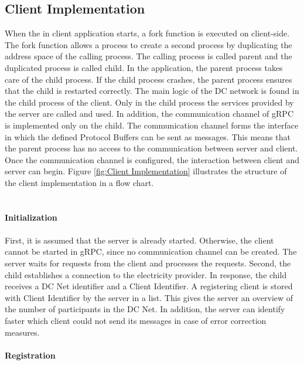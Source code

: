 \subsection{Client Implementation}
When the in client application starts, a fork function is executed on client-side. The fork function allows a process to create a second process by duplicating the address space of the calling process. The calling process is called parent and the duplicated process is called child. In the application, the parent process takes care of the child process. If the child process crashes, the parent process ensures that the child is restarted correctly. The main logic of the DC network is found in the child process of the client. Only in the child process the services provided by the server are called and used. In addition, the communication channel of gRPC is implemented only on the child. The communication channel forms the interface in which the defined Protocol Buffers can be sent as messages. This means that the parent process has no access to the communication between server and client. Once the communication channel is configured, the interaction between client and server can begin. Figure \ref{fig:Client Implementation} illustrates the structure of the client implementation in a flow chart.
\\
\\
\\
\textbf{Initialization}
\\
\\
First, it is assumed that the server is already started. Otherwise, the client cannot be started in gRPC, since no communication channel can be created. The server waits for requests from the client and processes the requests. Second, the child establishes a connection to the electricity provider. In response, the child receives a DC Net identifier and a Client Identifier. A registering client is stored with Client Identifier by the server in a list. This gives the server an overview of the number of participants in the DC Net. In addition, the server can identify faster which client could not send its messages in case of error correction measures. \\
\\
\textbf{Registration}
\\

